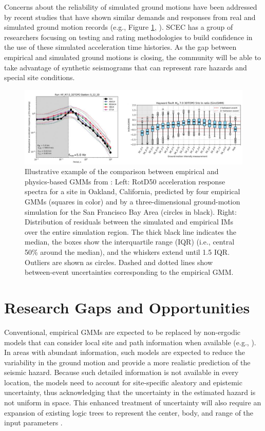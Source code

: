 Concerns about the reliability of simulated ground motions have been addressed by recent studies that have shown similar demands and responses from real and simulated ground motion records (e.g., Figure \ref{fig:haz_EmpricalVsSimulated}, \cite{galasso2013validation, rodgers2019broadband}). SCEC has a group of researchers focusing on testing and rating methodologies to build confidence in the use of these simulated acceleration time histories. As the gap between empirical and simulated ground motions is closing, the community will be able to take advantage of synthetic seismograms that can represent rare hazards and special site conditions.

\begin{figure}[htb]
    \centering
    \includegraphics[width=1.0\textwidth, angle = 0]{Figures/EmpiricalVsSimulated.pdf}
    \caption{Illustrative example of the comparison between empirical and physics-based GMMs from \citep{rodgers2019broadband}: Left: RotD50 acceleration response spectra for a site in Oakland, California, predicted by four empirical GMMs (squares in color) and by a three-dimensional ground-motion simulation for the San Francisco Bay Area (circles in black). Right: Distribution of residuals between the simulated and empirical IMs over the entire simulation region. The thick black line indicates the median, the boxes show the interquartile range (IQR) (i.e., central 50\% around the median), and the whiskers extend until 1.5 IQR. Outliers are shown as circles. Dashed and dotted lines show between-event uncertainties corresponding to the empirical GMM.}
    \label{fig:haz_EmpricalVsSimulated}
\end{figure}

\section{Research Gaps and Opportunities}
\label{sec:eq_shake_gaps}

Conventional, empirical GMMs are expected to be replaced by non-ergodic models that can consider local site and path information when available (e.g., \cite{abrahamson2019probabilistic}). In areas with abundant information, such models are expected to reduce the variability in the ground motion and provide a more realistic prediction of the seismic hazard. Because such detailed information is not available in every location, the models need to account for site-specific aleatory and epistemic uncertainty, thus acknowledging that the uncertainty in the estimated hazard is not uniform in space. This enhanced treatment of uncertainty will also require an expansion of existing logic trees to represent the center, body, and range of the input parameters \citep{gerstenberger2020seismic}.

